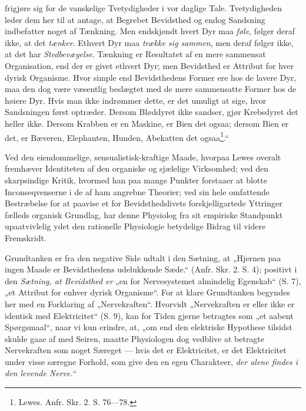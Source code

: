 \documentclass[12pt,a4paper]{book}
\begin{document}
frigjøre sig for de vanskelige Tvetydigheder i vor daglige Tale.
Tvetydigheden leder dem her til at antage, at Begrebet Bevidsthed og
endog Sandsning indbefatter noget af Tænkning. Men endskjøndt hvert Dyr
maa \emph{føle}, følger deraf ikke, at det \emph{tænker}. Ethvert Dyr maa
\emph{trække sig sammen}, men deraf følger ikke, at det har
\emph{Stedbevægelse}. Tænkning er Resultatet af en mere sammensat
Organisation,
\setcounter{footnote}{0}
end der er givet ethvert Dyr; men Bevidsthed er Attribut for hver dyrisk
Organisme. Hvor simple end Bevidsthedens Former ere hos de lavere Dyr,
maa den dog være væsentlig beslægtet med de mere sammensatte Former hos
de høiere Dyr. Hvis man ikke indrømmer dette, er det umuligt at sige,
hvor Sandsningen først optræder. Dersom Bløddyret ikke sandser, gjør
Krebsdyret det heller ikke. Dersom Krabben er en Maskine, er Bien det
ogsaa; dersom Bien er det, er Bæveren, Elephanten, Hunden, Abekatten det
ogsaa\footnote{Lewes. Anfr. Skr. 2. S. 76---78.}.“

Ved den eiendommelige, sensualistisk-kraftige Maade, hvorpaa Lewes
overalt fremhæver Identiteten af den organiske og sjælelige Virksomhed;
ved den skarpsindige Kritik, hvormed han paa mange Punkter forstaaer at
blotte Inconseqvenserne i de af ham angrebne Theorier; ved sin hele
omfattende Bestræbelse for at paavise et for Bevidsthedslivets
forskjelligartede Yttringer fælleds organisk Grundlag, har denne
Physiolog fra sit empiriske Standpunkt upaatvivlelig ydet den rationelle
Physiologie betydelige Bidrag til videre Fremskridt.

Grundtanken er fra den negative Side udtalt i den Sætning, at „Hjernen
paa ingen Maade er Bevidsthedens udelukkende Sæde.“ (Anfr. Skr. 2. S. 4);
positivt i den \emph{Sætning, at Bevidsthed er} „en for Nervesystemet
almindelig Egenskab“ (S. 7), „et Attribut for enhver dyrisk Organisme“.
For at klare Grundtanken begyndes her med en Forklaring af
„Nervekraften“. Hvorvidt „Nervekraften er eller ikke er identisk med
Elektricitet“ (S. 9), kan for Tiden gjerne betragtes som „et aabent
Spørgsmaal“, naar vi kun erindre, at, „om end den elektriske Hypothese
tilsidst skulde gaae af med Seiren, maatte Physiologen dog vedblive at
betragte Nervekraften som noget Særeget --- hvis det er Elektricitet, er
det Elektricitet under visse særegne Forhold, som give den en egen
Charakteer, \emph{der alene findes i den levende Nerve.}“
\setcounter{footnote}{0}
\end{document}
